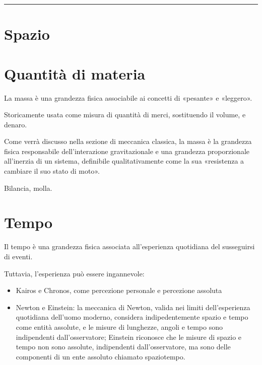 \documentclass[letterpaper,10pt,italian]{jupyterBook}
\begin{document}
\bigskip\hrule\bigskip


\sphinxstepscope


\section{Spazio}
\label{\detokenize{ch/intro/physical_quantities-space:spazio}}\label{\detokenize{ch/intro/physical_quantities-space:physics-hs-intro-physical-quantities-space}}\label{\detokenize{ch/intro/physical_quantities-space::doc}}
\sphinxstepscope


\section{Quantità di materia}
\label{\detokenize{ch/intro/physical_quantities-mass:quantita-di-materia}}\label{\detokenize{ch/intro/physical_quantities-mass:physics-hs-intro-physical-quantities-mass}}\label{\detokenize{ch/intro/physical_quantities-mass::doc}}
\sphinxAtStartPar
La massa è una grandezza fisica associabile ai concetti di «pesante» e «leggero».

\sphinxAtStartPar
Storicamente usata come misura di quantità di merci, sostituendo il volume, e denaro.

\sphinxAtStartPar
Come verrà discusso nella sezione di meccanica classica, la massa è la grandezza fisica responsabile dell’interazione gravitazionale e una grandezza proporzionale all’inerzia di un sistema, definibile qualitativamente come la sua «resistenza a cambiare il suo stato di moto».

\sphinxAtStartPar
{} Bilancia, molla.

\sphinxstepscope


\section{Tempo}
\label{\detokenize{ch/intro/physical_quantities-time:tempo}}\label{\detokenize{ch/intro/physical_quantities-time:physics-hs-intro-physical-quantities-time}}\label{\detokenize{ch/intro/physical_quantities-time::doc}}
\sphinxAtStartPar
Il tempo è una grandezza fisica associata all’esperienza quotidiana del susseguirsi di eventi.

\sphinxAtStartPar
Tuttavia, l’esperienza può essere ingannevole:
\begin{itemize}
\item {} 
\sphinxAtStartPar
Kairos e Chronos, come percezione personale e percezione assoluta

\item {} 
\sphinxAtStartPar
Newton e Einstein: la meccanica di Newton, valida nei limiti dell’esperienza quotidiana dell’uomo moderno, considera indipedentemente spazio e tempo come entità assolute, e le misure di lunghezze, angoli e tempo sono indipendenti dall’osservatore; Einstein riconosce che le misure di spazio e tempo non sono assolute, indipendenti dall’osservatore, ma sono delle componenti di un ente assoluto chiamato spazio\sphinxhyphen{}tempo.

\end{itemize}
\end{document}
